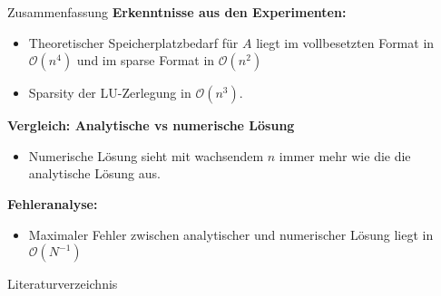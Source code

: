 \documentclass[9pt, t]{beamer}
\newcommand\BigO{\mathcal{O}}
\begin{document}
\begin{frame}{Zusammenfassung}
    \textbf{Erkenntnisse aus den Experimenten:}
    \begin{itemize}[<+->]
        \item Theoretischer Speicherplatzbedarf für \(A\) liegt im
              vollbesetzten Format in \(\BigO(n^4)\) und im sparse Format in
              \(\BigO(n^2)\)
        \item Sparsity der LU-Zerlegung in \(\BigO(n^3)\).
    \end{itemize}

    \textbf{Vergleich: Analytische vs numerische Lösung}
    \begin{itemize}[<+->]
        \item Numerische Lösung sieht mit wachsendem \(n\) immer mehr wie die
              die analytische Lösung aus.
    \end{itemize}

    \textbf{Fehleranalyse:}
    \begin{itemize}[<+->]
        \item Maximaler Fehler zwischen analytischer und numerischer Lösung
              liegt in \(\BigO(N^{-1})\)
    \end{itemize}
\end{frame}

\begin{frame}{Literaturverzeichnis}
    \printbibliography%
\end{frame}
\end{document}
